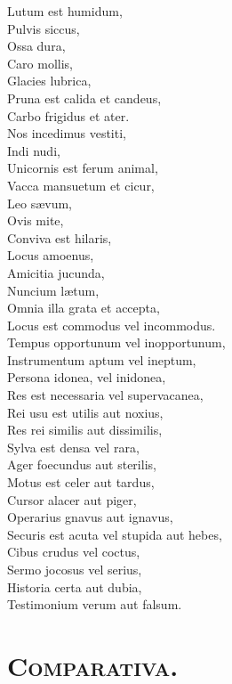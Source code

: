 \documentclass[12pt, twocolumn]{memoir}
\begin{document}
Lutum est humidum,\\
Pulvis siccus,\\
Ossa dura,\\
Caro mollis,\\
Glacies lubrica,\\
Pruna est calida et candeus,\\
Carbo frigidus et ater.\\
Nos incedimus vestiti,\\
Indi nudi,\\
Unicornis est ferum animal,\\
Vacca mansuetum et cicur,\\
Leo sævum,\\
Ovis mite,\\
Conviva est hilaris,\\
Locus amoenus,\\
Amicitia jucunda,\\
Nuncium lætum,\\
Omnia illa grata et accepta,\\
Locus est commodus vel incommodus.\\
Tempus opportunum vel inopportunum,\\
Instrumentum aptum vel ineptum,\\
Persona idonea, vel inidonea,\\
Res est necessaria vel supervacanea,\\
Rei usu est utilis aut noxius,\\
Res rei similis aut dissimilis,\\
Sylva est densa vel rara,\\
Ager foecundus aut sterilis,\\
Motus est celer aut tardus,\\
Cursor alacer aut piger,\\
Operarius gnavus aut ignavus,\\
Securis est acuta vel stupida aut hebes,\\
Cibus crudus vel coctus,\\
Sermo jocosus vel serius,\\
Historia certa aut dubia,\\
Testimonium verum aut falsum.\\

\section*{\textsc{Comparativa.}}
\end{document}
